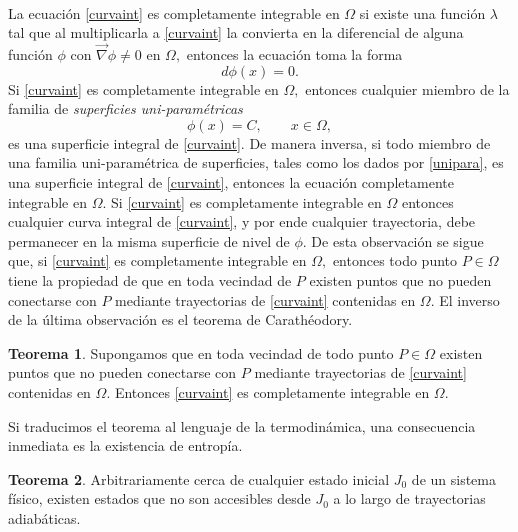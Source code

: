 \documentclass{article}
\theoremstyle{definition} \newtheorem{defi}{Definici\'on}
\theoremstyle{definition} \newtheorem{teo}{Teorema}
\theoremstyle{definition} \newtheorem{cor}{Corolario}
\begin{document}
\paragraph{}
La ecuaci\'on \eqref{curvaint} es completamente integrable en $\Omega$ si existe una funci\'on $\lambda$ tal que al multiplicarla a \eqref{curvaint} la convierta en la diferencial de alguna funci\'on $\phi$ con $\vec \nabla \phi\neq0$ en $\Omega,$ entonces la ecuaci\'on toma la forma
$$d\phi(x)=0.$$
Si \eqref{curvaint} es completamente integrable en $\Omega,$ entonces cualquier miembro de la familia de \emph{superficies uni-param\'etricas}
\begin{equation}\label{unipara}
\phi(x)=C, \qquad x\in\Omega,
\end{equation}
es una superficie integral de \eqref{curvaint}. De manera inversa, si todo miembro de una familia uni-param\'etrica de superficies, tales como los dados por \eqref{unipara}, es una superficie integral de \eqref{curvaint}, entonces la ecuaci\'on completamente integrable en $\Omega.$ Si \eqref{curvaint} es completamente integrable en $\Omega$ entonces cualquier curva integral de \eqref{curvaint}, y por ende cualquier trayectoria, debe permanecer en la misma superficie de nivel de $\phi$. De esta observaci\'on se sigue que, si \eqref{curvaint} es completamente integrable en $\Omega,$ entonces todo punto $P\in\Omega$ tiene la propiedad de que en toda vecindad de $P$ existen puntos que no pueden conectarse con $P$ mediante trayectorias de \eqref{curvaint} contenidas en $\Omega.$ El inverso de la \'ultima observaci\'on es el teorema de Carath\'eodory.
\begin{teo}
Supongamos que en toda vecindad de todo punto $P\in\Omega$ existen puntos que no pueden conectarse con $P$ mediante trayectorias de \eqref{curvaint} contenidas en $\Omega$. Entonces \eqref{curvaint} es completamente integrable en $\Omega$.
\end{teo}
Si traducimos el teorema al lenguaje de la termodin\'amica, una consecuencia inmediata es la existencia de entrop\'ia.
\begin{teo}
Arbitrariamente cerca de cualquier estado inicial $J_0$ de un sistema f\'isico, existen estados que no son accesibles desde $J_0$ a lo largo de trayectorias adiab\'aticas.
\end{teo}
\end{document}

